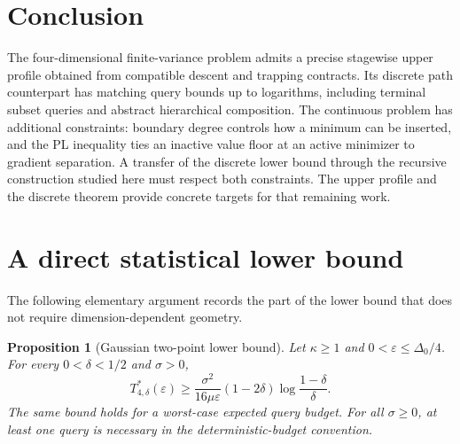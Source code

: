 \documentclass[11pt,a4paper]{article}
\newcommand{\eps}{\varepsilon}
\newtheorem{proposition}[theorem]{Proposition}
\theoremstyle{definition}
\theoremstyle{remark}
\begin{document}
\section{Conclusion}

The four-dimensional finite-variance problem admits a precise
stagewise upper profile obtained from compatible descent and
trapping contracts.  Its discrete path counterpart has matching
query bounds up to logarithms, including terminal subset queries
and abstract hierarchical composition.  The continuous problem
has additional constraints: boundary degree controls how a
minimum can be inserted, and the PL inequality ties an inactive
value floor at an active minimizer to gradient separation.
A transfer of the discrete lower bound through the recursive
construction studied here must respect both constraints.
The upper profile and the discrete theorem provide concrete
targets for that remaining work.

\appendix

\section{A direct statistical lower bound}
\label{app:statistical-lower}

The following elementary argument records the part of the lower
bound that does not require dimension-dependent geometry.

\begin{proposition}[Gaussian two-point lower bound]
\label{prop:two-point}
Let $\kappa\ge1$ and $0<\eps\le\Delta_0/4$.
For every $0<\delta<1/2$ and $\sigma>0$,
\begin{equation}
 T^*_{4,\delta}(\eps)
 \ge
 \frac{\sigma^2}{16\mu\eps}
 (1-2\delta)\log\frac{1-\delta}{\delta}.
 \label{eq:gaussian-lower}
\end{equation}
The same bound holds for a worst-case expected query budget.
For all $\sigma\ge0$, at least one query is necessary in the
deterministic-budget convention.
\end{proposition}
\end{document}

